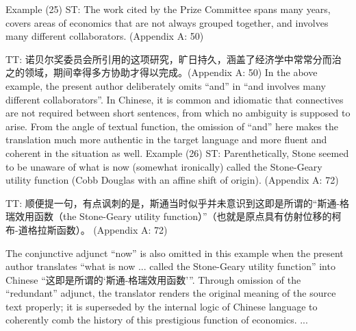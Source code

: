 	Example (25) ST: The work cited by the Prize Committee spans many years, covers areas of economics that are not always grouped together, and involves many different collaborators. (Appendix A: 50)
	
	TT: 诺贝尔奖委员会所引用的这项研究，旷日持久，涵盖了经济学中常常分而治之的领域，期间幸得多方协助才得以完成。(Appendix A: 50)
	In the above example, the present author deliberately omits “and” in “and involves many different collaborators”. In Chinese, it is common and idiomatic that connectives are not required between short sentences, from which no ambiguity is supposed to arise. From the angle of textual function, the omission of “and” here makes the translation much more authentic in the target language and more fluent and coherent in the situation as well.
	Example (26) ST: Parenthetically, Stone seemed to be unaware of what is now (somewhat ironically) called the Stone-Geary utility function (Cobb Douglas with an affine shift of origin). (Appendix A: 72)
	
	TT: 顺便提一句，有点讽刺的是，斯通当时似乎并未意识到这即是所谓的“斯通-格瑞效用函数（the Stone-Geary utility function）”（也就是原点具有仿射位移的柯布-道格拉斯函数）。 (Appendix A: 72)
	
	The conjunctive adjunct “now” is also omitted in this example when the present author translates “what is now ... called the Stone-Geary utility function” into Chinese “这即是所谓的‘斯通-格瑞效用函数’”. Through omission of the “redundant” adjunct, the translator renders the original meaning of the source text properly; it is superseded by the internal logic of Chinese language to coherently comb the history of this prestigious function of economics.
	...